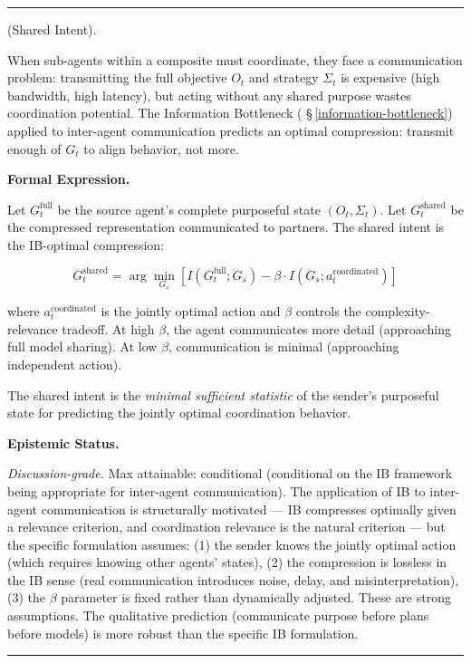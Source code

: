 \documentclass[11pt,oneside]{article}
\newcounter{claim}[section]
\renewcommand{\theclaim}{\thesection.\arabic{claim}}
\newenvironment{segment}[2]{%
  \refstepcounter{claim}%
  \bigskip\noindent\hrule\smallskip
  \noindent{\bfseries #1~\theclaim}\enskip(#2).\par\smallskip
  \noindent\ignorespaces
}{%
  \par\smallskip\noindent\hrule\bigskip
}
\newenvironment{definition}[1][]{\begin{segment}{Definition}{#1}}{\end{segment}}
\begin{document}
\begin{definition}[Shared Intent]
\label{shared-intent}
When sub-agents within a composite must coordinate, they face a communication problem: transmitting the full objective $O_t$ and strategy $\Sigma_t$ is expensive (high bandwidth, high latency), but acting without any shared purpose wastes coordination potential. The Information Bottleneck ( \S\,\ref{information-bottleneck}) applied to inter-agent communication predicts an optimal compression: transmit enough of $G_t$ to align behavior, not more.



\medskip\noindent\textbf{Formal Expression.}



Let $G_t^{\text{full}}$ be the source agent's complete purposeful state $(O_t, \Sigma_t)$. Let $G_t^{\text{shared}}$ be the compressed representation communicated to partners. The shared intent is the IB-optimal compression:

$$G_t^{\text{shared}} = \arg\min_{G_s} \left[ I(G_t^{\text{full}}; G_s) - \beta \cdot I(G_s; a_t^{\text{coordinated}}) \right]$$

where $a_t^{\text{coordinated}}$ is the jointly optimal action and $\beta$ controls the complexity-relevance tradeoff. At high $\beta$, the agent communicates more detail (approaching full model sharing). At low $\beta$, communication is minimal (approaching independent action).

The shared intent is the \textit{minimal sufficient statistic} of the sender's purposeful state for predicting the jointly optimal coordination behavior.


\medskip\noindent\textbf{Epistemic Status.}


\textit{Discussion-grade.} Max attainable: conditional (conditional on the IB framework being appropriate for inter-agent communication). The application of IB to inter-agent communication is structurally motivated — IB compresses optimally given a relevance criterion, and coordination relevance is the natural criterion — but the specific formulation assumes: (1) the sender knows the jointly optimal action (which requires knowing other agents' states), (2) the compression is lossless in the IB sense (real communication introduces noise, delay, and misinterpretation), (3) the $\beta$ parameter is fixed rather than dynamically adjusted. These are strong assumptions. The qualitative prediction (communicate purpose before plans before models) is more robust than the specific IB formulation.



\end{definition}
\end{document}
